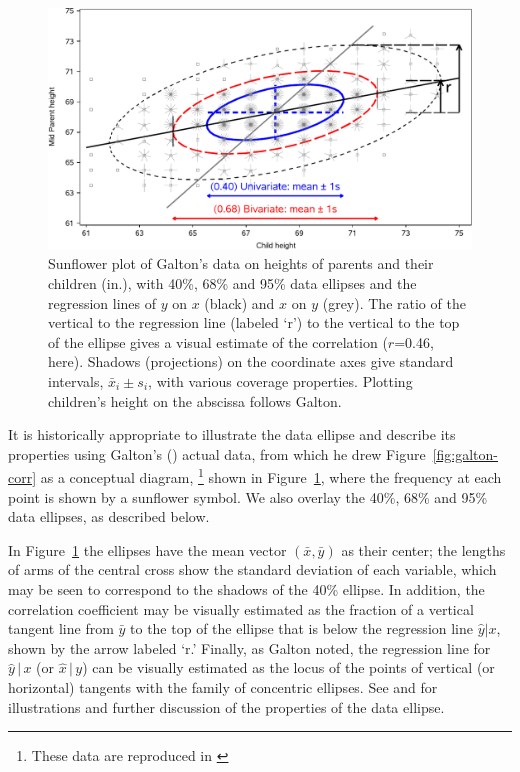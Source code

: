 \documentclass[11pt]{article}%
\newcommand*{\figref}[1]{Figure~\ref{#1}}
\newcommand*{\given}{\ensuremath{\, | \,}}
\begin{document}
\begin{figure}[htb]
  \centering
  \includegraphics[width=.9\textwidth,clip]{fig/galton-reg3}
  \caption{Sunflower plot of Galton's data on heights of parents and their children (in.), with
  40\%, 68\% and 95\% data ellipses and the regression lines of $y$ on $x$ (black) and
  $x$ on $y$ (grey). The ratio of the vertical to the regression line (labeled `r') to the vertical
  to the top of the ellipse gives a visual estimate of the correlation ($r$=0.46, here).
  Shadows (projections) on the coordinate axes give standard intervals,
  $\bar{x}_i \pm s_i$, with various coverage properties.
  Plotting children's height on the abscissa follows Galton.
  }%
  \label{fig:galton-reg3}
\end{figure}

It is historically appropriate to illustrate the data ellipse and
describe its properties using Galton's (\citeyear[Table
I]{Galton:1886}) actual
data, from which he drew \figref{fig:galton-corr} as a conceptual
diagram,%
\footnote{These data are reproduced in \citet[Table 8.2, p.
286]{Stigler:1986}}
shown in \figref{fig:galton-reg3}, where the frequency at
each point is shown by a sunflower symbol. We also overlay the 40\%,
68\% and 95\% data ellipses, as described below.

In \figref{fig:galton-reg3} the ellipses have the mean vector
$(\bar{x}, \bar{y})$ as their center;  the lengths of arms of the
central cross show the standard deviation of each variable, which
may be seen to correspond to the shadows of the 40\% ellipse.  In
addition, the correlation coefficient may be visually estimated as
the fraction of a vertical tangent line from $\bar{y}$ to the top of
the ellipse that is below the regression line $\hat{y} | x$, shown
by the arrow labeled `r.' Finally, as Galton noted, the regression line
for $\hat{y} \given x$ (or $\hat{x} \given y$)
can be visually estimated as the locus of the points of vertical
(or horizontal) tangents with the family of concentric ellipses.
See \citet[Fig. 5.1--5.2]{Monette:90} and
\citet[p. 183]{Friendly:91} for illustrations and further discussion
of the properties of the data ellipse.
\end{document}
